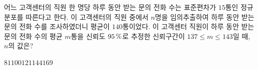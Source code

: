 어느 고객센터의 직원 한 명당 하루 동안 받는 문의 전화 수는 표준편차가 $15$통인 정규분포를 따른다고 한다. 이 고객센터의 직원 중에서 $n$명을 임의추출하여 하루 동안 받는 문의 전화 수를 조사하였더니 평균이 $140$통이었다. 이 고객센터 직원이 하루 동안 받는 문의 전화 수의 평균 $m$통을 신뢰도 $95\mkern3mu \%$로 추정한 신뢰구간이 $137\le m\le 143$일 때, $n$의 값은? 
\begin{choices32}{$81$}{$100$}{$121$}{$144$}{$169$}\end{choices32}
